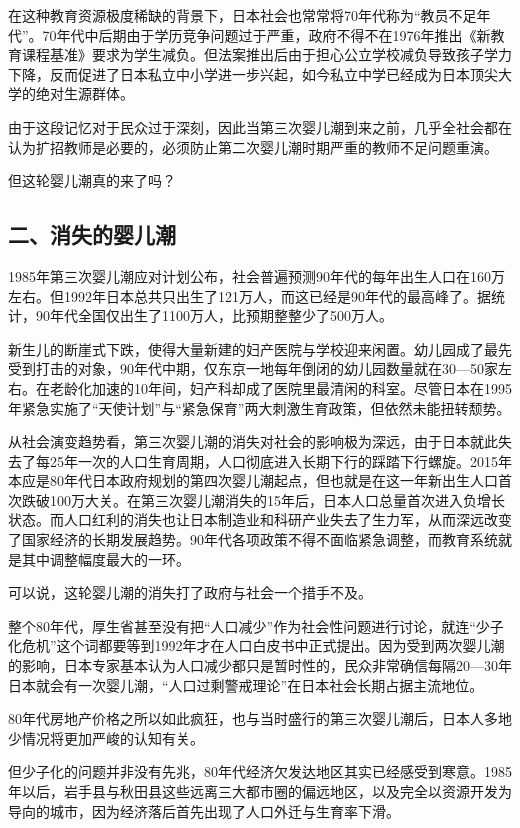 在这种教育资源极度稀缺的背景下，日本社会也常常将70年代称为“教员不足年代”。70年代中后期由于学历竞争问题过于严重，政府不得不在1976年推出《新教育课程基准》要求为学生减负。但法案推出后由于担心公立学校减负导致孩子学力下降，反而促进了日本私立中小学进一步兴起，如今私立中学已经成为日本顶尖大学的绝对生源群体。

由于这段记忆对于民众过于深刻，因此当第三次婴儿潮到来之前，几乎全社会都在认为扩招教师是必要的，必须防止第二次婴儿潮时期严重的教师不足问题重演。

但这轮婴儿潮真的来了吗？

\subsection{二、消失的婴儿潮}

1985年第三次婴儿潮应对计划公布，社会普遍预测90年代的每年出生人口在160万左右。但1992年日本总共只出生了121万人，而这已经是90年代的最高峰了。据统计，90年代全国仅出生了1100万人，比预期整整少了500万人。

新生儿的断崖式下跌，使得大量新建的妇产医院与学校迎来闲置。幼儿园成了最先受到打击的对象，90年代中期，仅东京一地每年倒闭的幼儿园数量就在30—50家左右。在老龄化加速的10年间，妇产科却成了医院里最清闲的科室。尽管日本在1995年紧急实施了“天使计划”与“紧急保育”两大刺激生育政策，但依然未能扭转颓势。

从社会演变趋势看，第三次婴儿潮的消失对社会的影响极为深远，由于日本就此失去了每25年一次的人口生育周期，人口彻底进入长期下行的踩踏下行螺旋。2015年本应是80年代日本政府规划的第四次婴儿潮起点，但也就是在这一年新出生人口首次跌破100万大关。在第三次婴儿潮消失的15年后，日本人口总量首次进入负增长状态。而人口红利的消失也让日本制造业和科研产业失去了生力军，从而深远改变了国家经济的长期发展趋势。90年代各项政策不得不面临紧急调整，而教育系统就是其中调整幅度最大的一环。

可以说，这轮婴儿潮的消失打了政府与社会一个措手不及。

整个80年代，厚生省甚至没有把“人口减少”作为社会性问题进行讨论，就连“少子化危机”这个词都要等到1992年才在人口白皮书中正式提出。因为受到两次婴儿潮的影响，日本专家基本认为人口减少都只是暂时性的，民众非常确信每隔20—30年日本就会有一次婴儿潮，“人口过剩警戒理论”在日本社会长期占据主流地位。

80年代房地产价格之所以如此疯狂，也与当时盛行的第三次婴儿潮后，日本人多地少情况将更加严峻的认知有关。

但少子化的问题并非没有先兆，80年代经济欠发达地区其实已经感受到寒意。1985年以后，岩手县与秋田县这些远离三大都市圈的偏远地区，以及完全以资源开发为导向的城市，因为经济落后首先出现了人口外迁与生育率下滑。

